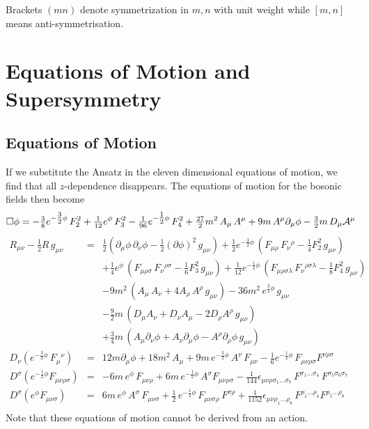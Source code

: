 \documentclass[a4paper,12pt]{article}
\newcommand{\ft}[2]{{\textstyle\frac{#1}{#2}}}
\begin{document}
\noindent
Brackets $(m n)$ denote symmetrization in $m,n$ with unit weight while $[m,n]$ means anti-symmetrisation.
\section{Equations of Motion and Supersymmetry} \label{theory}
\subsection{Equations of Motion}
If we substitute the Ansatz in the eleven dimensional equations of motion, we find that all $z$-dependence disappears. The equations of motion for the bosonic fields then become \cite{Lavrinenko:1998qa,Howe:1998qt}
\begin{displaymath}
\Box\phi = -\ft38 e^{-\ft32\phi}\, F_2^2 +\ft1{12}
e^\phi\, F_3^2 -\ft1{96} e^{-\ft12\phi}\, F_4^2 +\ft{27}2 m^2\,
A_\mu\, A^\mu + 9m\, A^\mu\partial_\mu\phi -\ft32 m\,
D_\mu{\cal A}^\mu
\end{displaymath}
\begin{eqnarray}
R_{\mu\nu} -\ft12 R\, g_{\mu\nu}&=& \ft12(\partial_\mu\phi\,
\partial_\nu\phi -\ft12 (\partial\phi)^2\, g_{\mu\nu}) 
+\ft12 e^{-\ft32\phi}\, (F_{\mu\rho}\, F_\nu{}^\rho 
-\ft14F_2^2\, g_{\mu\nu})\nonumber\\
&&+\ft1{4} e^\phi\, (F_{\mu\rho\sigma}\,
F_\nu{}^{\rho\sigma} -\ft16 F_3^2\, g_{\mu\nu}) + 
\ft1{12} e^{-\ft12\phi}\, (F_{\mu\rho\sigma\lambda}\,
F_\nu{}^{\rho\sigma\lambda} -\ft18 F_4^2\, g_{\mu\nu})\nonumber\\
&&
-9m^2\, (A_\mu\, A_\nu + 4A_\rho\, A^\rho\, g_{\mu\nu}) - 36m^2\, e^{\ft32\phi}\, g_{\mu\nu} \nonumber\\
&&-\ft92 m\, (D_\mu A_\nu +D_\nu A_\mu
-2D_\rho A^\rho\, g_{\mu\nu})\nonumber\\
&&+\ft34m\, (A_\mu\partial_\nu\phi + A_\nu\partial_\mu\phi -A^\rho\partial_\rho \phi\, g_{\mu\nu})\nonumber\\
D_\nu(e^{-\ft32\phi}\, F_\mu{}^\nu) &=& 12m\partial_\mu\phi
+18m^2\, A_\mu + 9m\, e^{-\ft32\phi}\, A^\nu\, F_{\mu\nu} -\ft16 e^{-\ft12\phi}\, F_{\mu\nu\rho\sigma}\nonumber
F^{\nu\rho\sigma}\nonumber\\ 
D^{\sigma}(e^{-\ft12\phi}F_{\mu\nu\rho\sigma})&=& -6m\,e^{\phi}\,
F_{\mu\nu\rho}+6m\, e^{-\ft12\phi}\, A^{\sigma}F_{\mu\nu\rho\sigma}
-\ft1{144}\epsilon_{\mu\nu\rho\sigma_1\dots\sigma_7}\,
F^{\sigma_1\dots\sigma_4}\,F^{\sigma_5\sigma_6\sigma_7}\nonumber\\
D^{\sigma}(e^{\phi}F_{\mu\nu\sigma})&=& 6m\,e^{\phi}\, A^\sigma \, 
F_{\mu\nu\sigma}+\ft12\, e^{-\ft12\phi}\, F_{\mu\nu\sigma\rho}\, 
F^{\sigma\rho} + \ft1{1152}
\epsilon_{\mu\nu\rho_1\dots\rho_8}\, F^{\rho_1\dots\rho_4}
F^{\rho_5\dots\rho_8}\nonumber\\
\end{eqnarray}
Note that these equations of motion cannot be derived from an action.
\end{document}
